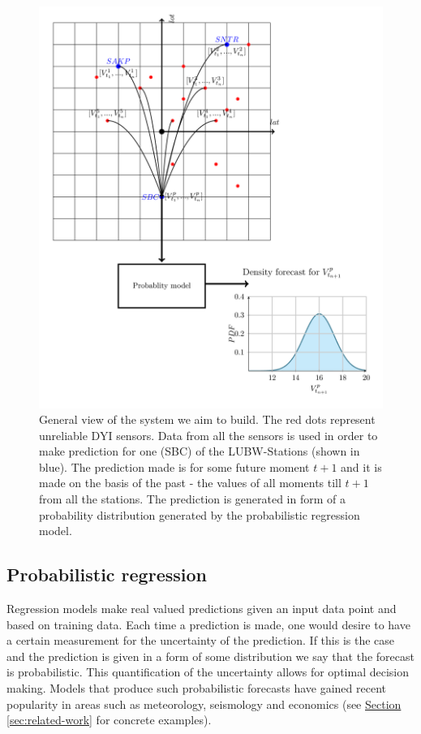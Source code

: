 \documentclass[12pt,a4paper,twoside]{scrartcl}
\numberwithin{equation}{section}
\newcommand{\refsec}[1]{\hyperref[#1]{Section \ref*{#1}}}
\begin{document}
\begin{center}
  \begin{figure}[htbp]
    \label{fig:general}
    \centering
    \includegraphics[height=1\textwidth, width=1\textwidth]{figures/general_system.png}
    \caption[General system]{General view of the system we aim to build. The red dots represent unreliable DYI sensors. Data from all the sensors is used in order to make prediction for one (SBC) of the LUBW-Stations (shown in blue). The prediction made is for some future moment \(t+1\) and it is made on the basis of the past - the values of all moments till \(t+1\) from all the stations. The prediction is generated in form of a probability distribution generated by the probabilistic regression model. }
  \end{figure}
\end{center}

\subsection{Probabilistic regression}
\label{sec:prob-regression}

Regression models make real valued predictions given an input data point and based on training data. Each time a prediction is made, one would desire to have a certain measurement for the uncertainty of the prediction. If this is the case and the prediction is given in a form of some distribution we say that the forecast is probabilistic. This quantification of the uncertainty allows for optimal decision making. Models that produce such probabilistic forecasts have gained recent popularity in areas such as meteorology, seismology and economics (see \refsec{sec:related-work} for concrete examples).
\end{document}
